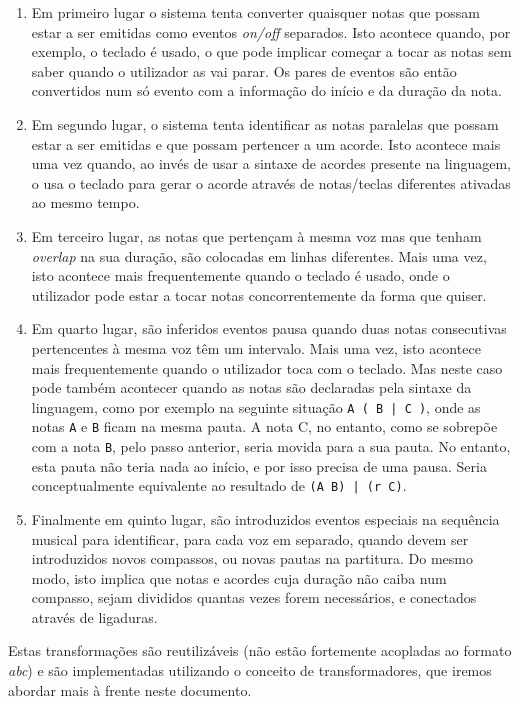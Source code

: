 \begin{enumerate}
 \item Em primeiro lugar o sistema tenta converter quaisquer notas que possam estar a ser emitidas como eventos \textit{on/off} separados. Isto acontece quando, por exemplo, o teclado é usado, o que pode implicar começar a tocar as notas sem saber quando o utilizador as vai parar. Os pares de eventos são então convertidos num só evento com a informação do início e da duração da nota.
 \item Em segundo lugar, o sistema tenta identificar as notas paralelas que possam estar a ser emitidas e que possam pertencer a um acorde. Isto acontece mais uma vez quando, ao invés de usar a sintaxe de acordes presente na linguagem, o usa o teclado para gerar o acorde através de notas/teclas diferentes ativadas ao mesmo tempo.
 \item Em terceiro lugar, as notas que pertençam à mesma voz mas que tenham \textit{overlap} na sua duração, são colocadas em linhas diferentes. Mais uma vez, isto acontece mais frequentemente quando o teclado é usado, onde o utilizador pode estar a tocar notas concorrentemente da forma que quiser.
 \item Em quarto lugar, são inferidos eventos pausa quando duas notas consecutivas pertencentes à mesma voz têm um intervalo. Mais uma vez, isto acontece mais frequentemente quando o utilizador toca com o teclado. Mas neste caso pode também acontecer quando as notas são declaradas pela sintaxe da linguagem, como por exemplo na seguinte situação \texttt{A ( B | C )}, onde as notas \texttt{A} e \texttt{B} ficam na mesma pauta. A nota C, no entanto, como se sobrepõe com a nota \texttt{B}, pelo passo anterior, seria movida para a sua pauta. No entanto, esta pauta não teria nada ao início, e por isso precisa de uma pausa. Seria conceptualmente equivalente ao resultado de \texttt{(A B) | (r C)}.
 \item Finalmente em quinto lugar, são introduzidos eventos especiais na sequência musical para identificar, para cada voz em separado, quando devem ser introduzidos novos compassos, ou novas pautas na partitura. Do mesmo modo, isto implica que notas e acordes cuja duração não caiba num compasso, sejam divididos quantas vezes forem necessários, e conectados através de \gls{ligaduras}.
\end{enumerate}

Estas transformações são reutilizáveis (não estão fortemente acopladas ao formato \textit{abc}) e são implementadas utilizando o conceito de transformadores, que iremos abordar mais à frente neste documento.

